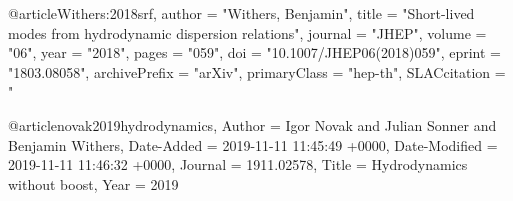 \documentclass[superscriptaddress,prd,nofootinbib,preprintnumbers,longbibliography,11pt,eqsecnum]{revtex4-1}
\begin{document}
 







@article{Withers:2018srf,
      author         = "Withers, Benjamin",
      title          = "{Short-lived modes from hydrodynamic dispersion
                        relations}",
      journal        = "JHEP",
      volume         = "06",
      year           = "2018",
      pages          = "059",
      doi            = "10.1007/JHEP06(2018)059",
      eprint         = "1803.08058",
      archivePrefix  = "arXiv",
      primaryClass   = "hep-th",
      SLACcitation   = "}


@article{novak2019hydrodynamics,
	Author = {Igor Novak and Julian Sonner and Benjamin Withers},
	Date-Added = {2019-11-11 11:45:49 +0000},
	Date-Modified = {2019-11-11 11:46:32 +0000},
	Journal = {1911.02578},
	Title = {Hydrodynamics without boost},
	Year = {2019}}
\end{document}
